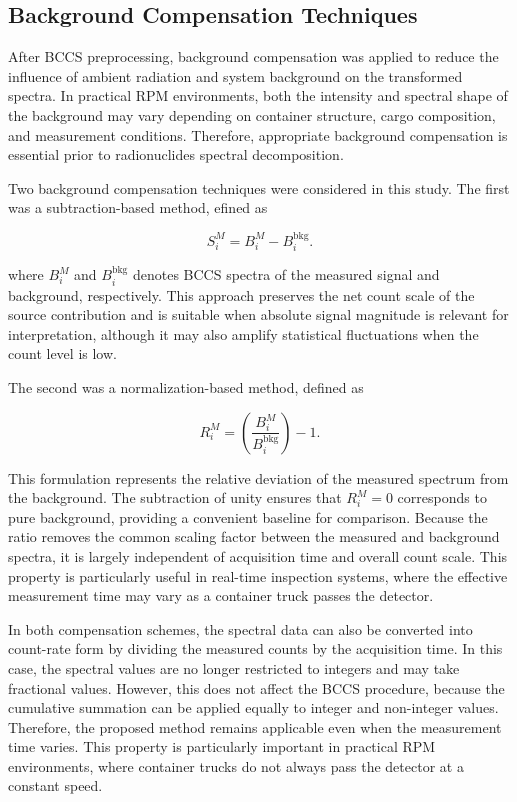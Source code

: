 \documentclass[10pt]{wlscirep}
\begin{document}
\subsection*{Background Compensation Techniques}

After BCCS preprocessing, background compensation was applied to reduce the influence of ambient radiation and system background on the transformed spectra. \color{red}In practical RPM environments, both the intensity and spectral shape of the background may vary depending on container structure, cargo composition, and measurement conditions. Therefore, appropriate background compensation is essential prior to radionuclides spectral decomposition.

Two background compensation techniques were considered in this study. The first was a subtraction-based method, \color{red}efined as 

\begin{equation}
S^M_i =  B^M_i - B_i^{\textrm{bkg}}. \label{eq:DS}
\end{equation}

where $B_i^M$ and $B_i^\text{bkg}$ denotes BCCS spectra of the measured signal and background, respectively. This approach preserves the net count scale of the source contribution and is suitable when absolute signal magnitude is relevant for interpretation, although it may also amplify statistical fluctuations when the count level is low.

The second was a normalization-based method, defined as 

\begin{equation}
R^M_i = \left(\dfrac{B^M_i}{B^{\textrm{bkg}}_i}\right) -1.\label{eq:NB}
\end{equation}

This formulation represents the relative deviation of the measured spectrum from the background. The subtraction of unity ensures that 
$R_i^M = 0$ corresponds to pure background, providing a convenient baseline for comparison. Because the ratio removes the common scaling factor between the measured and background spectra, it is largely independent of acquisition time and overall count scale. This property is particularly useful in real-time inspection systems, where the effective measurement time may vary as a container truck passes the detector.\normalcolor

\color{blue}
In both compensation schemes, the spectral data can also be converted into count-rate form by dividing the measured counts by the acquisition time. In this case, the {\color{red}spectral} values are no longer restricted to integers and may take fractional values. However, this does not affect the BCCS procedure, because the cumulative summation can be applied equally to integer and non-integer values. Therefore, the proposed method remains applicable even when the measurement time varies. This property is particularly important in practical RPM environments, where container trucks do not always pass the detector at a constant speed.
\end{document}
